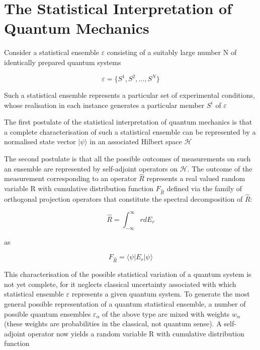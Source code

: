 \section{The Statistical Interpretation of Quantum Mechanics\cite{Breuer2002}}
Consider a statistical ensemble $\varepsilon$ consisting of a suitably large number N of identically prepared quantum systems

\begin{equation}
  \varepsilon = \{S^1, S^2, \ldots, S^N\}
\end{equation}

Such a statistical ensemble represents a particular set of experimental conditions, whose realisation in each instance generates a particular member $S^i$ of  $\varepsilon$

The first postulate of the statistical interpretation of quantum mechanics is that a complete characterisation of such a statistical ensemble can be represented by a normalised state vector $| \psi \rangle$ in an associated Hilbert space $\mathcal{H}$

The second postulate is that all the possible outcomes of measurements on such an ensemble are represented by self-adjoint operators on $\mathcal{H}$.
The outcome of the measurement corresponding to an operator $\hat{R}$ represents a real valued random variable R with cumulative distribution function $F_{\hat{R}}$ defined via the family of orthogonal projection operators that constitute the spectral decomposition of $\hat{R}$:

\begin{equation}
  \hat{R} = \int_{-\infty}^\infty rdE_r
\end{equation}

as

\begin{equation}
  F_{\hat{R}} = \langle \psi |E_r | \psi \rangle
\end{equation}

This characterisation of the possible statistical variation of a quantum system is not yet complete, for it neglects classical uncertainty associated with which statistical ensemble $\varepsilon$ represents a given quantum system.
To generate the most general possible representation of a quantum statistical ensemble, a number of possible quantum ensembles $\varepsilon_\alpha$ of the above type are mixed with weights $w_\alpha$ (these weights are probabilities in the classical, not quantum sense).
A self-adjoint operator now yields a random variable R with cumulative distribution function

